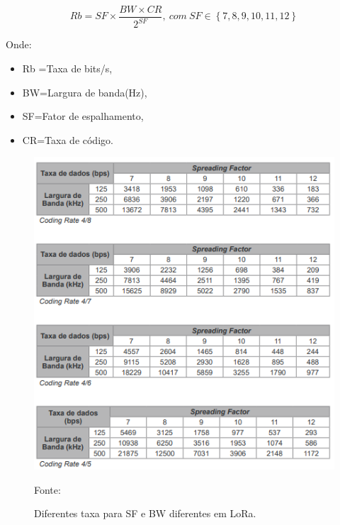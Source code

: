 \begin{center}
\begin{equation}
 \label{taxa de bits }
 Rb =SF  \times \frac{BW \times CR } {2^{SF}}  ,\ com\  SF \in \left\{7,8,9,10,11,12\right\}
 \end{equation}

 \end{center}
Onde:

\begin{itemize}

\item Rb =Taxa de bits/s,
\item BW=Largura de banda(Hz),
\item SF=Fator de espalhamento,
\item CR=Taxa de código.

\end{itemize}

\begin{figure}[H]
  \centering
  \includegraphics[width=\textwidth]{figuras/tabela de taxa lora.png}
  \caption{Diferentes taxa para SF e BW diferentes em LoRa. }
 { \footnotesize Fonte:\cite{aplicacaoloratabela}} 
  \label{fig:taxalora}
\end{figure}

